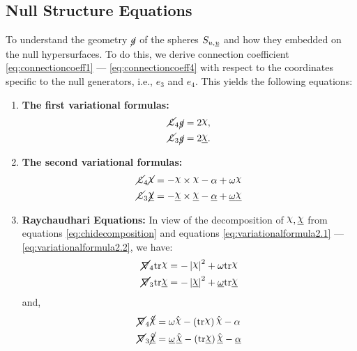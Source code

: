 \documentclass[12pt, a4paper]{report}
\theoremstyle{bfnote}
\newcommand{\underit}[1]{\textit{\underbar{#1}}}
\newcommand{\chits}{\raisebox{0.5ex}{$\chi$}} %
\begin{document}
\subsection{Null Structure Equations}
To understand the geometry $\cancel{g}$ of the spheres $S_{u, \underit{u}}$ and
how they embedded on the null hypersurfaces. To do this, we derive connection
coefficient \eqref{eq:connectioncoeff1} --- \eqref{eq:connectioncoeff4} with
respect to the coordinates specific to the null generators, i.e., $e_3$ and
$e_4$. This yields the following equations:
\begin{enumerate}[leftmargin=*, label={\bfseries{(\roman*)}}]
    \item \textbf{The first variational formulas:}
    \begin{align}
        \cancel{\mathcal{L}}_4\cancel{g} &= 2\chits, \label{eq:variationalformula1.1} \\
        \cancel{\mathcal{L}}_3\cancel{g} &= 2\underit{\chits}. \label{eq:variationalformula1.2}
    \end{align}

    \item \textbf{The second variational formulas:}
    \begin{align}
        \cancel{\mathcal{L}}_4\cancel{\chits} &= -\chits\times\chits -\alpha + \omega\chits\label{eq:variationalformula2.1} \\
        \cancel{\mathcal{L}}_3\cancel{\underit{\chits}} &= -\underit{\chits}\times\underit{\chits} -\underit{$\alpha$} + \underit{$\omega$}\underit{\chits}\label{eq:variationalformula2.2}
    \end{align}

    \item \textbf{Raychaudhari Equations:} In view of the decomposition of
    $\chits, \underit{\chits}$ from equations \eqref{eq:chidecomposition} and
    equations \eqref{eq:variationalformula2.1} ---
    \eqref{eq:variationalformula2.2}, we have:
    \begin{align}
        \cancel{\nabla}_4\mathrm{tr}{\chits} &= -\left|\chits\right|^2 + \omega\mathrm{tr}\chits \label{eq:raychaudhari1} \\
        \cancel{\nabla}_3\mathrm{tr}{\underit{\chits}} &= -\left|\underit{\chits}\right|^2 + \underit{$\omega$}\mathrm{tr}\underit{\chits} \label{eq:raychaudhari2} 
    \end{align}
    and,
    \begin{align}
        \cancel{\nabla}_4\cancel{\hat{\chits}} &= \omega\hat{\chits} - \left(\mathrm{tr}\chits\right)\hat{\chits} - \alpha \label{eq:chihatequations1} \\
        \cancel{\nabla}_3\cancel{\hat{\underit{\chits}}} &= \underit{$\omega$}\hspace{0.1em}\hat{\underit{\chits}} - \left(\mathrm{tr}\underit{\chits}\right)\hat{\underit{\chits}} - \underit{$\alpha$} \label{eq:chihatequations2}
    \end{align}
\end{enumerate}
\end{document}
